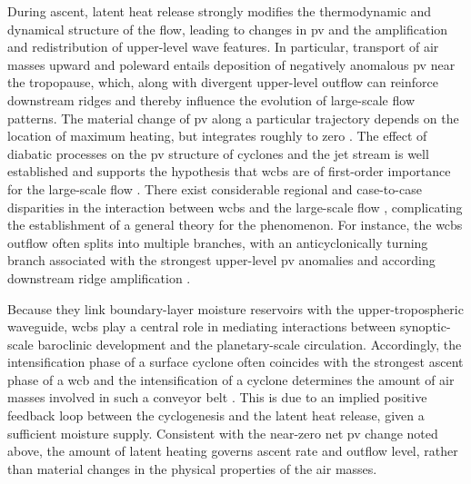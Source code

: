 During ascent, latent heat release strongly modifies the thermodynamic and
dynamical structure of the flow, leading to changes in \gls{pv} and
the amplification and redistribution of upper-level wave features.
In particular, transport of air masses upward and poleward entails deposition
of negatively anomalous \gls{pv} near the tropopause, which,
along with divergent upper-level outflow can reinforce downstream ridges
and thereby influence the evolution of large-scale flow patterns. The material
change of \gls{pv} along a particular trajectory depends on the
location of maximum heating, but integrates roughly to zero
\parencite{methvenPotentialVorticityWarm2015}. The effect of diabatic processes
on the \gls{pv} structure of cyclones
\parencite{chagnonDiabaticProcessesModifying2013} and the jet stream
\parencite{harveyDiabaticGenerationNegative2020} is well established
and supports the hypothesis that \glspl{wcb} are of first-order importance
for the large-scale
flow \parencite{wernliImportanceDiabaticProcesses2024}. There exist
considerable regional and case-to-case disparities in the interaction between
\glspl{wcb} and the large-scale flow
\parencite{vishnupriyaInteractionWarmConveyor2025}, complicating
the establishment of a general theory for the phenomenon. For instance,
the \glspl{wcb} outflow often splits into multiple branches, with an
anticyclonically turning branch associated with the strongest upper-level
\gls{pv} anomalies and according downstream ridge amplification
\parencite{heitmannWarmConveyorBelt2024}.

Because they link boundary-layer moisture reservoirs with the
upper-tropospheric waveguide, \glspl{wcb} play a central role in mediating
interactions between synoptic-scale baroclinic development and the
planetary-scale circulation. Accordingly, the intensification phase of a
surface cyclone often coincides with the strongest ascent phase
of a \gls{wcb} \parencite{heitmannWarmConveyorBelt2024} and the intensification
of a cyclone determines the amount of air masses involved in such a conveyor
belt \parencite{binderRoleWarmConveyor2016}. This is due to an implied positive
feedback loop between the cyclogenesis and the latent heat release, given a
sufficient moisture supply. Consistent with the near-zero net \gls{pv} change
noted above, the amount of latent heating governs ascent rate and outflow
level, rather than material changes in the physical properties of the air masses.

